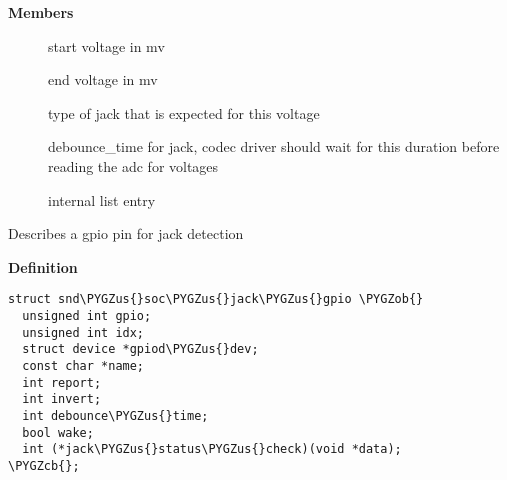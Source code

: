 \documentclass[a4paper,8pt,english]{sphinxmanual}
\def\PYGZus{\char`\_}
\def\PYGZob{\char`\{}
\def\PYGZcb{\char`\}}
\begin{document}
\textbf{Members}
\begin{description}
\item[{}] \leavevmode
start voltage in mv

\item[{}] \leavevmode
end voltage in mv

\item[{}] \leavevmode
type of jack that is expected for this voltage

\item[{}] \leavevmode
debounce\_time for jack, codec driver should wait for this
duration before reading the adc for voltages

\item[{}] \leavevmode
internal list entry

\end{description}

\begin{fulllineitems}
\label{sound/kernel-api/alsa-driver-api:c.snd_soc_jack_gpio}
Describes a gpio pin for jack detection

\end{fulllineitems}


\textbf{Definition}

\begin{Verbatim}[commandchars=\\\{\}]
struct snd\PYGZus{}soc\PYGZus{}jack\PYGZus{}gpio \PYGZob{}
  unsigned int gpio;
  unsigned int idx;
  struct device *gpiod\PYGZus{}dev;
  const char *name;
  int report;
  int invert;
  int debounce\PYGZus{}time;
  bool wake;
  int (*jack\PYGZus{}status\PYGZus{}check)(void *data);
\PYGZcb{};
\end{Verbatim}
\end{document}
